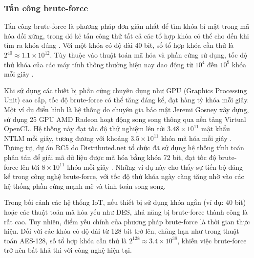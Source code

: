 \subsubsection{Tấn công brute-force}
Tấn công brute-force là phương pháp đơn giản nhất để tìm khóa bí mật trong mã hóa đối xứng, trong đó kẻ tấn công thử tất cả các tổ hợp khóa có thể cho đến khi tìm ra khóa đúng \cite{?}. Với một khóa có độ dài 40 bit, số tổ hợp khóa cần thử là \( 2^{40} \approx 1.1 \times 10^{12} \). Tùy thuộc vào thuật toán mã hóa và phần cứng sử dụng, tốc độ thử khóa của các máy tính thông thường hiện nay dao động từ \( 10^4 \) đến \( 10^9 \) khóa mỗi giây \cite{brute-force1}. 

Khi sử dụng các thiết bị phần cứng chuyên dụng như GPU (Graphics Processing Unit) cao cấp, tốc độ brute-force có thể tăng đáng kể, đạt hàng tỷ khóa mỗi giây. Một ví dụ điển hình là hệ thống do chuyên gia bảo mật Jeremi Gosney xây dựng, sử dụng 25 GPU AMD Radeon hoạt động song song thông qua nền tảng Virtual OpenCL. Hệ thống này đạt tốc độ thử nghiệm lên tới \( 3.48 \times 10^{11} \) mật khẩu NTLM mỗi giây, tương đương với khoảng \( 3.5 \times 10^{11} \) khóa mã hóa mỗi giây \cite{brute-force2}. Tương tự, dự án RC5 do Distributed.net tổ chức đã sử dụng hệ thống tính toán phân tán để giải mã dữ liệu được mã hóa bằng khóa 72 bit, đạt tốc độ brute-force lên tới \( 8 \times 10^{11} \) khóa mỗi giây \cite{brute-force3}. Những ví dụ này cho thấy sự tiến bộ đáng kể trong công nghệ brute-force, với tốc độ thử khóa ngày càng tăng nhờ vào các hệ thống phần cứng mạnh mẽ và tính toán song song.

Trong bối cảnh các hệ thống IoT, nếu thiết bị sử dụng khóa ngắn (ví dụ: 40 bit) hoặc các thuật toán mã hóa yếu như DES, khả năng bị brute-force thành công là rất cao. Tuy nhiên, điểm yếu chính của phương pháp brute-force là thời gian thực hiện. Đối với các khóa có độ dài từ 128 bit trở lên, chẳng hạn như trong thuật toán AES-128, số tổ hợp khóa cần thử là \( 2^{128} \approx 3.4 \times 10^{38} \), khiến việc brute-force trở nên bất khả thi với công nghệ hiện tại.

